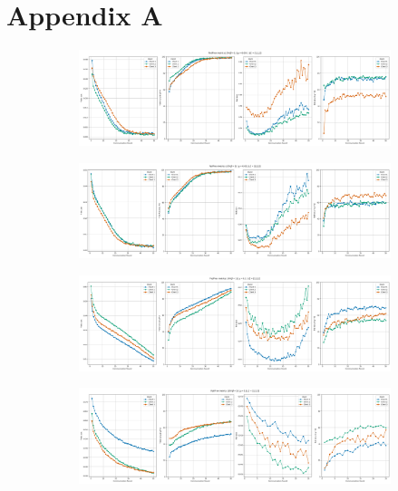 \chapter{Appendix A}

\begin{figure}[H]
    \centering

    \begin{subfigure}{\linewidth}
        \centering
        \includegraphics[width=0.8\linewidth]{figures/2-Federated_Learning/FedProx_Dirichlet_1_mu_0.001.png}
    \end{subfigure}
    \vspace{1em} %

    \begin{subfigure}{\linewidth}
        \centering
        \includegraphics[width=0.8\linewidth]{figures/2-Federated_Learning/FedProx_Dirichlet_1_mu_0.01.png}
    \end{subfigure}
    \vspace{1em} %

    \begin{subfigure}{\linewidth}
        \centering
        \includegraphics[width=0.8\linewidth]{figures/2-Federated_Learning/FedProx_Dirichlet_1_mu_0.1.png}
    \end{subfigure}
    \vspace{1em} %

    \begin{subfigure}{\linewidth}
        \centering
        \includegraphics[width=0.8\linewidth]{figures/2-Federated_Learning/FedProx_Dirichlet_1_mu_1.png}
    \end{subfigure}


\end{figure}
